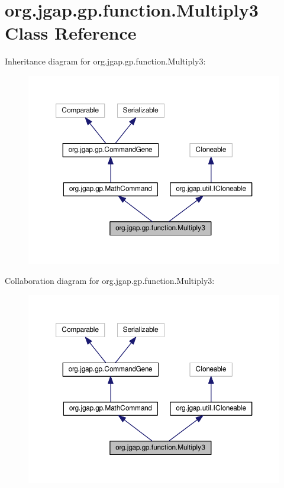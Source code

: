 \hypertarget{classorg_1_1jgap_1_1gp_1_1function_1_1_multiply3}{\section{org.\-jgap.\-gp.\-function.\-Multiply3 Class Reference}
\label{classorg_1_1jgap_1_1gp_1_1function_1_1_multiply3}
}


Inheritance diagram for org.\-jgap.\-gp.\-function.\-Multiply3\-:
\nopagebreak
\begin{figure}[H]
\begin{center}
\leavevmode
\includegraphics[width=350pt]{classorg_1_1jgap_1_1gp_1_1function_1_1_multiply3__inherit__graph}
\end{center}
\end{figure}


Collaboration diagram for org.\-jgap.\-gp.\-function.\-Multiply3\-:
\nopagebreak
\begin{figure}[H]
\begin{center}
\leavevmode
\includegraphics[width=350pt]{classorg_1_1jgap_1_1gp_1_1function_1_1_multiply3__coll__graph}
\end{center}
\end{figure}
